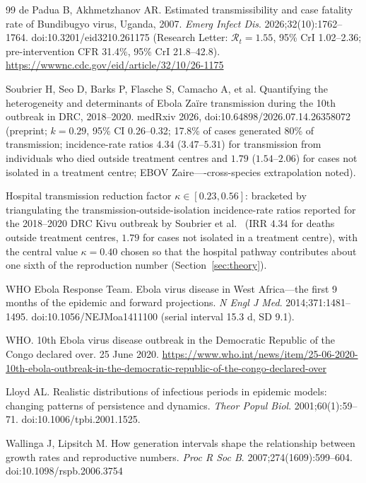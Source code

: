 \documentclass[10pt]{plos}
\newcommand{\Reff}{\mathcal{R}}
\begin{document}
\begin{thebibliography}{99}
 de Padua B, Akhmetzhanov AR. Estimated
transmissibility and case fatality rate of Bundibugyo virus, Uganda,
2007. \emph{Emerg Infect Dis}. 2026;32(10):1762--1764.
doi:10.3201/eid3210.261175 (Research Letter: $\Reff_t=1.55$, 95\% CrI
1.02--2.36; pre-intervention CFR 31.4\%, 95\% CrI 21.8--42.8).
\url{https://wwwnc.cdc.gov/eid/article/32/10/26-1175}

 Soubrier H, Seo D, Barks P, Flasche S, Camacho A,
et al. Quantifying the heterogeneity and determinants of Ebola Za\"ire
transmission during the 10th outbreak in DRC, 2018--2020. medRxiv
2026, doi:10.64898/2026.07.14.26358072 (preprint; $k=0.29$, 95\% CI
0.26--0.32; 17.8\% of cases generated 80\% of transmission; incidence-rate
ratios $4.34$ ($3.47$--$5.31$) for transmission from individuals who died
outside treatment centres and $1.79$ ($1.54$--$2.06$) for cases not
isolated in a treatment centre; EBOV Zaire----cross-species extrapolation
noted).

 Hospital transmission reduction factor
$\kappa\in[0.23,0.56]$: bracketed by triangulating the
transmission-outside-isolation incidence-rate ratios reported for the
2018--2020 DRC Kivu outbreak by Soubrier et al.\ \cite{Soubrier2026}
(IRR $4.34$ for deaths outside treatment centres, $1.79$ for cases not
isolated in a treatment centre), with the central value $\kappa=0.40$
chosen so that the hospital pathway contributes about one sixth of the
reproduction number (Section~\ref{sec:theory}).

 WHO Ebola Response Team. Ebola virus
disease in West Africa---the first 9 months of the epidemic and forward
projections. \emph{N Engl J Med}. 2014;371:1481--1495.
doi:10.1056/NEJMoa1411100 (serial interval 15.3 d, SD 9.1).

 WHO. 10th Ebola virus disease outbreak in the
Democratic Republic of the Congo declared over. 25 June 2020.
\url{https://www.who.int/news/item/25-06-2020-10th-ebola-outbreak-in-the-democratic-republic-of-the-congo-declared-over}

 Lloyd AL. Realistic distributions of infectious
periods in epidemic models: changing patterns of persistence and
dynamics. \emph{Theor Popul Biol}. 2001;60(1):59--71.
doi:10.1006/tpbi.2001.1525.

 Wallinga J, Lipsitch M. How generation intervals
shape the relationship between growth rates and reproductive numbers.
\emph{Proc R Soc B}. 2007;274(1609):599--604. doi:10.1098/rspb.2006.3754


\end{thebibliography}
\end{document}
